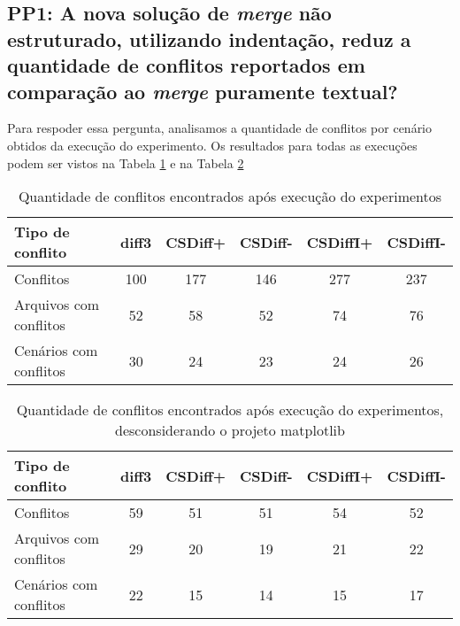 \subsection{PP1: A nova solução de \emph{merge} não estruturado, utilizando indentação,
	reduz a quantidade de conflitos reportados em comparação ao \emph{merge} puramente textual?}
Para respoder essa pergunta, analisamos a quantidade de conflitos por cenário obtidos da execução do experimento. Os
resultados para todas as execuções podem ser vistos na Tabela \ref{tabelaPP1_com_matplotlib} e na
Tabela \ref{tabelaPP1_sem_matplotlib}

\begin{table}[ht]
	\begin{center}
		\begin{tabular}{|l|c|c|c|c|c|}
			\hline
			\textbf{Tipo de conflito} & \textbf{diff3} & \textbf{CSDiff+} & \textbf{CSDiff-} & \textbf{CSDiffI+} & \textbf{CSDiffI-} \\
			\hline
			Conflitos                 & 100            & 177              & 146              & 277               & 237               \\
			Arquivos com conflitos    & 52             & 58               & 52               & 74                & 76                \\
			Cenários com conflitos    & 30             & 24               & 23               & 24                & 26                \\
			\hline
		\end{tabular}
	\end{center}
	\caption{Quantidade de conflitos encontrados após execução do experimentos}\label{tabelaPP1_com_matplotlib}
\end{table}

\begin{table}[ht]
	\begin{center}
		\begin{tabular}{|l|c|c|c|c|c|}
			\hline
			\textbf{Tipo de conflito} & \textbf{diff3} & \textbf{CSDiff+} & \textbf{CSDiff-} & \textbf{CSDiffI+} & \textbf{CSDiffI-} \\
			\hline
			Conflitos                 & 59             & 51               & 51               & 54                & 52                \\
			Arquivos com conflitos    & 29             & 20               & 19               & 21                & 22                \\
			Cenários com conflitos    & 22             & 15               & 14               & 15                & 17                \\
			\hline
		\end{tabular}
	\end{center}
	\caption{Quantidade de conflitos encontrados após execução do experimentos, desconsiderando o
		projeto matplotlib}\label{tabelaPP1_sem_matplotlib}
\end{table}

